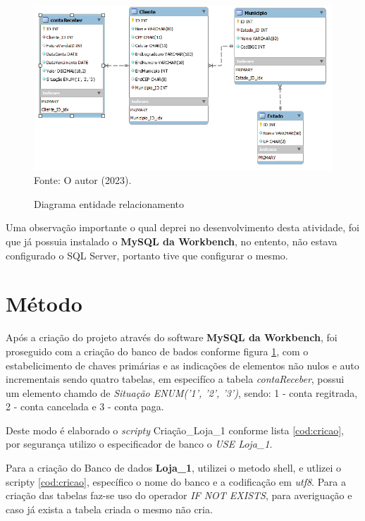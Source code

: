 \begin{figure}[h!]
  \caption{Diagrama entidade relacionamento}
  \includegraphics[width=\textwidth]{figure/diagram_EER.png}
  \label{fig:DER}
  {\fontsize{10pt}{\baselineskip}\selectfont
  Fonte: O autor (2023).}
\end{figure}

\par Uma observação importante o qual deprei no desenvolvimento desta atividade, foi que já possuia instalado o \textbf{MySQL da Workbench}, no entento, não estava configurado o SQL Server, portanto tive que configurar o mesmo.

\newpage

\section{Método}
\par Após a criação do projeto através do software \textbf{MySQL da Workbench}, foi proseguido com a criação do banco de bados conforme figura \ref{fig:DER}, com o estabelicimento de chaves primárias e as indicações de elementos não nulos e auto incrementais sendo quatro tabelas, em especifíco a tabela \textit{contaReceber}, possui um elemento chamdo de \textit{Situação ENUM('1', '2', '3')}, sendo: 1 - conta regitrada, 2 - conta cancelada e 3 - conta paga.


\par Deste modo é elaborado o \textit{scripty} Criação\_Loja\_1 conforme lista \ref{cod:cricao}, por segurança utilizo o especificador de banco o \textit{USE Loja\_1}.
\par Para a criação do Banco de dados \textbf{Loja\_1}, utilizei o metodo shell, e utlizei o scripty \autoref{cod:cricao}, específico o nome do banco e a codificação em \textit{utf8}. Para a criação das tabelas faz-se uso do operador \textit{IF NOT EXISTS}, para averiguação e caso já exista a tabela criada o mesmo não cria.

